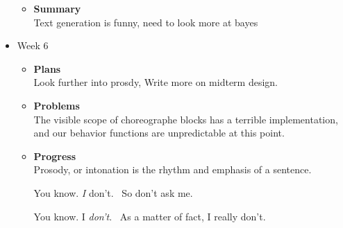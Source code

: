 \begin{itemize}
\begin{itemize}
				\item \textbf{Summary} \\
				Text generation is funny, need to look more at bayes 
			\end{itemize}
		\item{Week 6}
			\begin{itemize}
				\item \textbf{Plans} \\
				Look further into prosdy, Write more on midterm design.
				\item \textbf{Problems} \\
				The visible scope of choreographe blocks has a terrible implementation, and our behavior functions are unpredictable at this point.
				\item \textbf{Progress} \\
			Prosody, or intonation is the rhythm and emphasis of a sentence. 

			 

			You know. \textit{I} don’t. \ So don’t ask me.

			You know. I \textit{don’t}. \ As a matter of fact, I really don’t.


\end{itemize}
\end{itemize}
